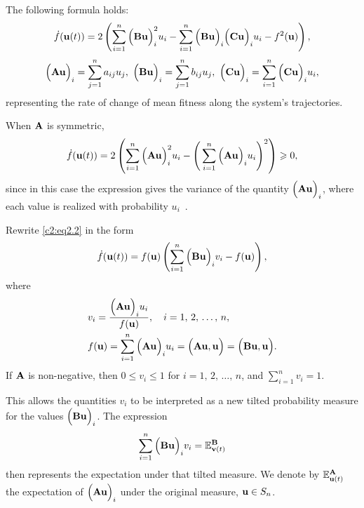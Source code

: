 \documentclass[12pt]{report}
\theoremstyle{definition}
\theoremstyle{remark}
\begin{document}
The following formula holds:
\begin{equation}
	\dot{f}({\bf u}(t)) = 2\left(\sum\limits_{i = 1}^{n}\Big({\bf Bu}\Big)_{i}^{2}u_{i} - \sum\limits_{i = 1}^{n}\Big({\bf Bu}\Big)_{i}\Big({\bf Cu}\Big)_{i}u_{i} - f^{2}({\bf u})\right),
	\label{c2:eq2.2}
\end{equation}
\begin{equation*}
	\Big({\bf Au}\Big)_{i} = \sum\limits_{j = 1}^{n}a_{ij}u_{j}, \,\, \Big({\bf Bu}\Big)_{i} = \sum\limits_{j = 1}^{n}b_{ij}u_{j}, \,\, \Big({\bf Cu}\Big)_{i} = \sum\limits_{i = 1}^{n}\Big({\bf Cu}\Big)_{i}u_{i},
\end{equation*}
representing the rate of change of mean fitness along the system's trajectories.

When ${\bf A}$ is symmetric,
\begin{equation*}
	\dot{f}({\bf u}(t)) = 2\left(\sum\limits_{i = 1}^{n}\Big({\bf Au}\Big)_{i}^{2}u_{i} - \Bigg(\sum\limits_{i = 1}^{n}\Big({\bf Au}\Big)_{i}u_{i}\Bigg)^{2}\right) \geqslant 0,
\end{equation*}
since in this case the expression gives the variance of the quantity $\Big({\bf Au}\Big)_{i}$, where each value is realized with probability $u_{i}$~\cite{c2:Kimura1958}.

Rewrite \eqref{c2:eq2.2} in the form
\begin{equation*}
	\dot{f}({\bf u}(t)) = f({\bf u}) \left(\sum\limits_{i = 1}^{n}\Big({\bf Bu}\Big)_{i}v_{i} - f({\bf u})\right),
\end{equation*}
where
\begin{equation*}
	\begin{aligned}
		&v_i = \dfrac{\Big({\bf Au}\Big)_{i}u_i}{f({\bf u})}, \quad i=1,\,2,\, \ldots,\, n, \\
		&f({\bf u}) = \sum\limits_{i = 1}^{n} \Big({\bf Au}\Big)_{i}u_i = \Big({\bf Au, u}\Big) = \Big({\bf Bu, u}\Big).
	\end{aligned}
\end{equation*}
If ${\bf A}$ is non-negative, then $0 \leqslant v_i \leqslant 1$ for $i=1,\,2,\, \ldots,\, n$, and $\sum\limits_{i = 1}^{n} v_i = 1$.

This allows the quantities $v_i$ to be interpreted as a new tilted probability measure for the values $\Big({\bf Bu}\Big)_i$. The expression
\begin{equation*}
	\sum\limits_{i = 1}^{n}\Big({\bf Bu}\Big)_iv_i = \mathbb{E}_{{\bf v}(t)}^{\bf B}
\end{equation*}
then represents the expectation under that tilted measure. We denote by $\mathbb{E}_{{\bf u}(t)}^{\bf A}$ the expectation of $\Big({\bf Au}\Big)_i$ under the original measure, ${\bf u} \in S_n$.
\end{document}
